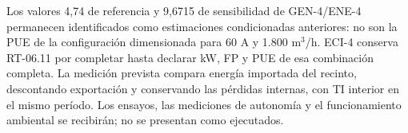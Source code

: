 Los valores 4,74 de referencia y 9,6715 de sensibilidad de GEN-4/ENE-4 permanecen identificados como estimaciones condicionadas anteriores: no son la PUE de la configuración dimensionada para 60 A y 1.800 m$^3$/h. ECI-4 conserva RT-06.11 por completar hasta declarar kW, FP y PUE de esa combinación completa. La medición prevista compara energía importada del recinto, descontando exportación y conservando las pérdidas internas, con TI interior en el mismo período. Los ensayos, las mediciones de autonomía y el funcionamiento ambiental se recibirán; no se presentan como ejecutados.
